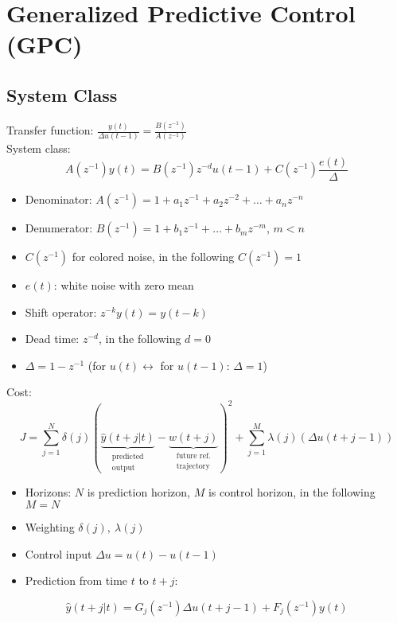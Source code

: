 \documentclass[english]{latex4ei/latex4ei_sheet}
\begin{document}
\section{Generalized Predictive Control (GPC)}
\begin{sectionbox}

\subsection{System Class}
Transfer function: $\frac{y(t)}{\Delta u(t-1)}=\frac{B(z^{-1})}{A(z^{-1})}$\\
System class:
$$A\left(z^{-1}\right) y(t)=B\left(z^{-1}\right) z^{-d} u(t-1)+C\left(z^{-1}\right) \frac{e(t)}{\Delta}$$
\begin{itemize}
    \item Denominator: $A\left(z^{-1}\right)=1+a_{1} z^{-1}+a_{2} z^{-2}+\ldots+a_{n} z^{-n}$
    \item Denumerator: $B\left(z^{-1}\right)=1+b_{1} z^{-1}+\ldots+b_{m} z^{-m}$, $m<n$
    \item $C\left(z^{-1}\right)$ for colored noise, in the following $C\left(z^{-1}\right)=1$
    \item $e(t)$: white noise with zero mean
    \\
    \item Shift operator: $z^{-k} y(t)=y(t-k)$
    \item Dead time: $z^{-d}$, in the following $d=0$
    \item $\Delta=1-z^{-1}$ (for $u(t) \leftrightarrow$ for $u(t-1)$: $\Delta=1$)
\end{itemize} \vspace{0.1cm}
Cost: 
$$J=\sum_{j=1}^{N} \delta(j)(\underbrace{\hat{y}(t+j | t)}_{\substack{\text{predicted} \\ \text{output}}}-\underbrace{w(t+j)}_{\substack{\text{future ref.} \\ \text{trajectory}}})^{2}+\sum_{j=1}^{M} \lambda(j)(\Delta u(t+j-1))
$$
\begin{itemize}
    \item Horizons: $N$ is prediction horizon, $M$ is control horizon, in the following $M=N$
    \item Weighting $\delta(j),\ \lambda(j)$
    \item Control input $\Delta u = u(t)-u(t-1)$
    \item Prediction from time $t$ to $t+j$:
\end{itemize}
$$\hat{y}(t+j | t)=G_{j}(z^{-1})\Delta u(t+j-1)+F_{j}(z^{-1})y(t)
$$


\end{sectionbox}
\end{document}
